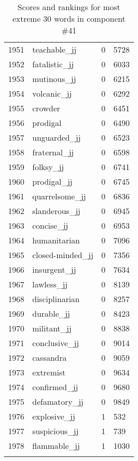 \begin{longtable}[!htbp]{| rlr@{.}l |}
    1951 & teachable\_jj & 0 & 5728 \\
    1952 & fatalistic\_jj & 0 & 6033 \\
    1953 & mutinous\_jj & 0 & 6215 \\
    1954 & volcanic\_jj & 0 & 6292 \\
    1955 & crowder & 0 & 6451 \\
    1956 & prodigal & 0 & 6490 \\
    1957 & unguarded\_jj & 0 & 6523 \\
    1958 & fraternal\_jj & 0 & 6598 \\
    1959 & folksy\_jj & 0 & 6741 \\
    1960 & prodigal\_jj & 0 & 6745 \\
    1961 & quarrelsome\_jj & 0 & 6836 \\
    1962 & slanderous\_jj & 0 & 6945 \\
    1963 & concise\_jj & 0 & 6953 \\
    1964 & humanitarian & 0 & 7096 \\
    1965 & closed-minded\_jj & 0 & 7356 \\
    1966 & insurgent\_jj & 0 & 7634 \\
    1967 & lawless\_jj & 0 & 8139 \\
    1968 & disciplinarian & 0 & 8257 \\
    1969 & durable\_jj & 0 & 8423 \\
    1970 & militant\_jj & 0 & 8838 \\
    1971 & conclusive\_jj & 0 & 9014 \\
    1972 & cassandra & 0 & 9059 \\
    1973 & extremist & 0 & 9634 \\
    1974 & confirmed\_jj & 0 & 9680 \\
    1975 & defamatory\_jj & 0 & 9849 \\
    1976 & explosive\_jj & 1 & 532 \\
    1977 & suspicious\_jj & 1 & 739 \\
    1978 & flammable\_jj & 1 & 1030 \\
    \hline
    \caption{Scores and rankings for most extreme 30 words in component \#41} \\
\end{longtable}
